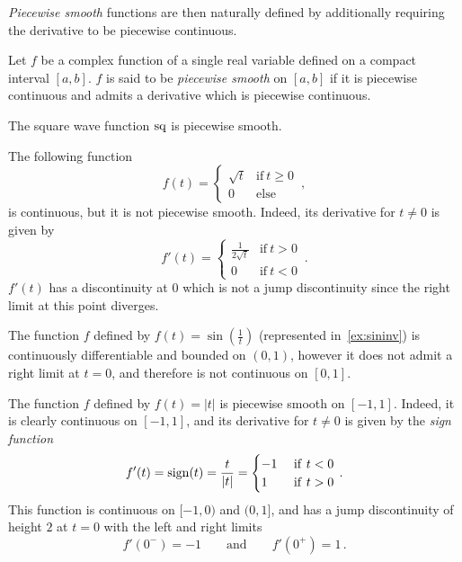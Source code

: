 \emph{Piecewise smooth} functions are then naturally defined by additionally requiring the
derivative to be piecewise continuous.
\begin{definition}
  \label{def:pw-smooth}
  Let $f$ be a complex function of a single real variable defined on a compact interval
  $[a,b]$. $f$ is said to be \emph{piecewise smooth} on $[a,b]$ if it is piecewise
  continuous and admits a derivative which is piecewise continuous.
\end{definition}
\begin{example}
  The square wave function $\operatorname{sq}$ is piecewise smooth.
\end{example}
\begin{example}
  The following function
  \begin{equation}
    f(t)=
    \begin{cases}
      \sqrt{t} & \text{if}~t\geq 0\\
      0 & \text{else}
    \end{cases}\,,
  \end{equation}
  is continuous, but it is not piecewise smooth. Indeed, its derivative for $t\neq 0$ is
  given by
  \begin{equation}
    f'(t)=
    \begin{cases}
      \frac{1}{2\sqrt{t}} & \text{if}~t>0\\
      0 & \text{if}~t<0
    \end{cases}\,.
  \end{equation}
  $f'(t)$ has a discontinuity at $0$ which is not a jump discontinuity since the right
  limit at this point diverges.
\end{example}
\begin{example}
  \label{ex:sininv}
  The function $f$ defined by $f(t)=\sin(\frac{1}{t})$ (represented in~\cref{ex:sininv})
  is continuously differentiable and bounded on $(0,1)$, however it does not admit a right
  limit at $t=0$, and therefore is not continuous on $[0,1]$.
\end{example}
\begin{example}
  The function $f$ defined by $f(t)=|t|$ is piecewise smooth on $[-1,1]$. Indeed, it is
  clearly continuous on $[-1,1]$, and its derivative for $t\neq 0$ is given by the
  \emph{sign function}
  \begin{equation}
    f'(t)=\operatorname{sign}(t)=\frac{t}{|t|}=
    \begin{cases}
      -1&~\mathrm{if}~t<0\\
      1&~\mathrm{if}~t>0
    \end{cases}\,.
  \end{equation}
  This function is continuous on $[-1,0)$ and $(0,1]$, and has a jump discontinuity of
  height $2$ at $t=0$ with the left and right limits
  \begin{equation}
    f'(0^-)=-1\qquad\text{and}\qquad f'(0^+)=1\,.
  \end{equation}
\end{example}

